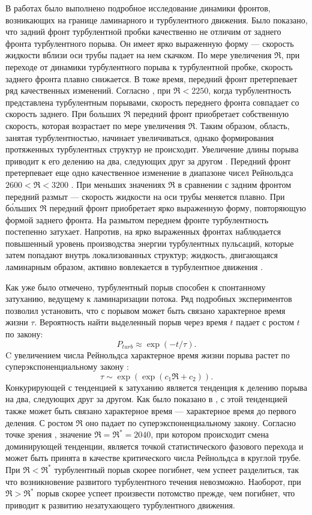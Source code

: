 В работах \cite{Moxey2010, Barkley2015, Song2017} было выполнено подробное исследование динамики фронтов, возникающих на границе ламинарного и турбулентного движения. Было показано, что задний фронт турбулентной пробки качественно не отличим от заднего фронта турбулентного порыва. Он имеет ярко выраженную форму --- скорость жидкости вблизи оси трубы падает на нем скачком. По мере увеличения $\Re$, при переходе от динамики турбулентного порыва к турбулентной пробке, скорость заднего фронта плавно снижается. В тоже время, передний фронт претерпевает ряд качественных изменений. Согласно \cite{Moxey2010}, при $\Re < 2250$, когда турбулентность представлена турбулентным порывами, скорость переднего фронта совпадает со скорость заднего. При больших $\Re$ передний фронт приобретает собственную скорость, которая возрастает по мере увеличения $\Re$. Таким образом, область, занятая турбулентностью, начинает увеличиваться, однако формирования протяженных турбулентных структур не происходит. Увеличение длины порыва приводит к его делению на два, следующих друг за другом \cite{Moxey2010}. Передний фронт претерпевает еще одно качественное изменение в диапазоне чисел Рейнольдса $2600 < \Re < 3200$ \cite{Barkley2015}. При меньших значениях $\Re$ в сравнении с задним фронтом передний размыт --- скорость жидкости на оси трубы меняется плавно. При б\'{о}льших $\Re$ передний фронт приобретает ярко выраженную форму, повторяющую формой заднего фронта. На размытом переднем фронте турбулентность постепенно затухает. Напротив, на ярко выраженных фронтах наблюдается повышенный уровень производства энергии турбулентных пульсаций, которые затем попадают внутрь локализованных структур; жидкость, двигающаяся ламинарным образом, активно вовлекается в турбулентное движения \cite{Song2017}. 

Как уже было отмечено, турбулентный порыв способен к спонтанному затуханию, ведущему к ламинаризации потока. Ряд подробных экспериментов \cite{Hof2006finite, Willis2007, Peixinho2007} позволил установить, что с порывом может быть связано характерное время жизни $\tau$. Вероятность найти выделенный порыв через время $t$ падает с ростом $t$ по закону:
$$P_{turb} \approx \exp(-t/\tau).$$ 
C увеличением числа Рейнольдса характерное время жизни порыва растет по суперэкспоненциальному закону \cite{Hof2008, Kuik2010}:
$$\tau \sim \exp(\exp(c_1 \Re + c_2)).$$ 
Конкурирующей с тенденцией к затуханию является тенденция к делению порыва на два, следующих друг за другом. Как было показано в \cite{Avila2011}, с этой тенденцией также может быть связано характерное время --- характерное время до первого деления. С ростом $\Re$ оно падает по суперэкспоненциальному закону. Согласно точке зрения \cite{Avila2011}, значение $\Re=\Re^*=2040$, при котором происходит смена доминирующей тенденции, является точкой статистического фазового перехода и может быть принята в качестве критического числа Рейнольдса в круглой трубе. При $\Re<\Re^*$ турбулентный порыв скорее погибнет, чем успеет разделиться, так что возникновение развитого турбулентного течения невозможно. Наоборот, при $\Re>\Re^*$ порыв скорее успеет произвести потомство прежде, чем погибнет, что приводит к развитию незатухающего турбулентного движения. 

